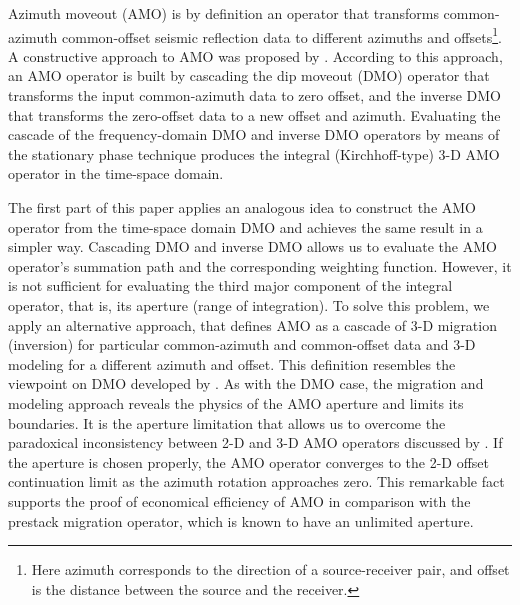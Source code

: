 Azimuth moveout (AMO) is by definition an operator that transforms
common-azimuth common-offset seismic reflection data to different
azimuths and offsets\footnote{Here azimuth corresponds to the
direction of a source-receiver pair, and offset is the distance
between the source and the receiver.}. A constructive approach to 
AMO was proposed by \cite{Biondi.sep.80.125}.  According to this approach, an AMO
operator is built by cascading the dip moveout (DMO) operator that
transforms the input common-azimuth data to zero offset, and the inverse
DMO that transforms the zero-offset data to a new offset and azimuth.
Evaluating the cascade of the frequency-domain DMO and  inverse DMO
operators by means of the stationary phase technique produces the
integral (Kirchhoff-type) 3-D AMO operator in the time-space domain. 
\par
The first part of this paper applies an analogous idea to construct the AMO
operator from the time-space domain DMO and
achieves the same result in a simpler way.
Cascading DMO and inverse DMO allows us to evaluate the AMO operator's
summation path and the corresponding weighting function. However, it
is not sufficient for evaluating the third major component of the
integral operator, that is, its aperture (range of integration). To solve this
problem, we apply an 
alternative approach, that 
defines AMO as a cascade of 3-D migration (inversion) for 
particular common-azimuth  
and common-offset data and 3-D modeling for a different azimuth and
offset. This   
definition resembles the viewpoint on DMO developed by \cite{GPR29-03-03740406}. As with the DMO case, the
migration and modeling  approach  reveals the physics of the AMO
aperture and limits its boundaries. 
It is the aperture limitation
that allows us to overcome the paradoxical inconsistency between 2-D
and 3-D AMO operators discussed by \cite{Biondi.sep.80.125}. 
If the aperture is chosen properly, the AMO operator converges to the 2-D
offset continuation limit as the azimuth rotation approaches zero.  
This remarkable fact supports the proof of economical
efficiency of AMO in comparison with the prestack migration operator,
which is known to have an unlimited aperture. 

